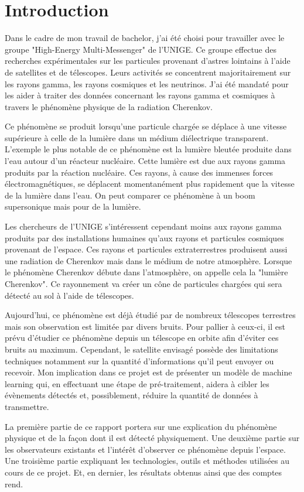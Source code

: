 \chapter*{Introduction}

Dans le cadre de mon travail de bachelor, j'ai été choisi pour travailler avec le groupe "High-Energy Multi-Messenger" de l'UNIGE.
Ce groupe effectue des recherches expérimentales sur les particules provenant d'astres lointains à l'aide de satellites et de télescopes.
Leurs activités se concentrent majoritairement sur les rayons gamma, les rayons cosmiques et les neutrinos.
J'ai été mandaté pour les aider à traiter des données concernant les rayons gamma et cosmiques à travers le phénomène physique de la radiation Cherenkov. 

Ce phénomène se produit lorsqu'une particule chargée se déplace à une vitesse supérieure à celle de la lumière dans un médium diélectrique transparent. 
L'exemple le plus notable de ce phénomène est la lumière bleutée produite dans l'eau autour d'un réacteur nucléaire. 
Cette lumière est due aux rayons gamma produits par la réaction nucléaire. Ces rayons, à cause des immenses forces électromagnétiques, se déplacent momentanément plus 
rapidement que la vitesse de la lumière dans l'eau.
On peut comparer ce phénomène à un boom supersonique mais pour de la lumière.

Les chercheurs de l'UNIGE s'intéressent cependant moins aux rayons gamma produits par des installations humaines qu'aux rayons et particules cosmiques provenant de l'espace.
Ces rayons et particules extraterrestres produisent aussi une radiation de Cherenkov mais dans le médium de notre atmosphère.
Lorsque le phénomène Cherenkov débute dans l'atmosphère, on appelle cela la "lumière Cherenkov".
Ce rayonnement va créer un cône de particules chargées qui sera détecté au sol à l'aide de télescopes. 

Aujourd'hui, ce phénomène est déjà étudié par de nombreux télescopes terrestres mais son observation est limitée par
divers bruits. Pour pallier à ceux-ci, il est prévu d'étudier ce phénomène depuis un télescope en orbite afin d'éviter ces bruits au maximum.
Cependant, le satellite envisagé possède des limitations techniques notamment sur la quantité d'informations qu'il peut envoyer ou recevoir.
Mon implication dans ce projet est de présenter un modèle de machine learning qui, en effectuant une étape de pré-traitement, aidera à cibler les
évènements détectés et, possiblement, réduire la quantité de données à transmettre.

La première partie de ce rapport portera sur une explication du phénomène physique et de la façon dont il est détecté physiquement.
Une deuxième partie sur les observateurs existants et l'intérêt d'observer ce phénomène depuis l'espace.
Une troisième partie expliquant les technologies, outils et méthodes utilisées au cours de ce projet.
Et, en dernier, les résultats obtenus ainsi que des comptes rend.